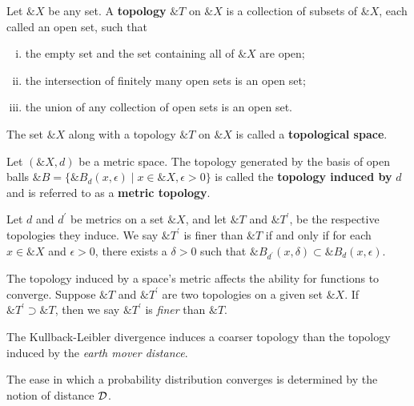 \begin{definition}
  Let $\&X$ be any set. A \textbf{topology} $\&T$ on $\&X$ is a
  collection of subsets of $\&X$, each called an open set, such that
  \begin{enumerate}[(i)]
  \item the empty set and the set containing all of $\&X$ are open;
  \item the intersection of finitely many open sets is an open set;
  \item the union of any collection of open sets is an open set.
  \end{enumerate} The set $\&X$ along with a topology $\&T$ on $\&X$
  is called a \textbf{topological space}.
\end{definition}

\begin{definition}
  \label{def:topology}
  Let $(\&X, d)$ be a metric space.  The topology generated by the
  basis of open balls
  $\&B = \{\&B_d(x, \epsilon) \mid x \in \&X, \epsilon > 0\}$ is
  called the \textbf{topology induced by} $d$ and is referred to as a
  \textbf{metric topology}.
\end{definition}

\begin{theorem}
  Let $d$ and $d^\prime$ be metrics on  a set $\&X$, and let $\&T$ and
  $\&T^\prime$,  be the  respective  topologies they  induce.  We  say
  $\&T^\prime$ is finer than $\&T$ if and only if for each $x \in \&X$
  and  $\epsilon  >  0$,  there  exists  a  $\delta  >  0$  such  that
  $\&B_{d^\prime}(x, \delta) \subset \&B_d(x, \epsilon)$.
\end{theorem}


The topology induced by a space's metric affects the ability for
functions to converge. Suppose $\&T$ and $\&T^\prime$ are two
topologies on a given set $\&X$. If $\&T^\prime \supset \&T$, then we
say $\&T^\prime$ is \textit{finer} than $\&T$.

The Kullback-Leibler divergence induces a coarser topology than the
topology induced by the \textit{earth mover distance}.

The ease in which a probability distribution converges is determined
by the notion of distance $\mathcal{D}_{\text{\tiny}}$.

